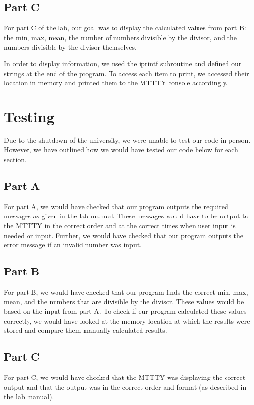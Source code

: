 \documentclass[10pt, letterpaper, titlepage]{article} %
\begin{document}
\begin{multicols*}{2}
\subsection{Part C}
For part C of the lab, our goal was to display the calculated values from part B: the min, max, mean, the number of numbers divisible by the divisor, and the numbers divisible by the divisor themselves. 

In order to display information, we used the iprintf subroutine and defined our strings at the end of the program. To access each item to print, we accessed their location in memory and printed them to the MTTTY console accordingly.

\section{Testing}
Due to the shutdown of the university, we were unable to test our code in-person. 
However, we have outlined how we would have tested our code below for each section.

\subsection{Part A}
For part A, we would have checked that our program outputs the required messages as given in the lab manual. 
These messages would have to be output to the MTTTY in the correct order and at the correct times when user input is needed or input. 
Further, we would have checked that our program outputs the error message if an invalid number was input.

\subsection{Part B}
For part B, we would have checked that our program finds the correct min, max, mean, and the numbers that are divisible by the divisor. 
These values would be based on the input from part A. 
To check if our program calculated these values correctly, we would have looked at the memory location at which the results were stored and compare them manually calculated results.

\subsection{Part C}
For part C, we would have checked that the MTTTY was displaying the correct output and that the output was in the correct order and format (as described in the lab manual). 


\end{multicols*}
\end{document}
